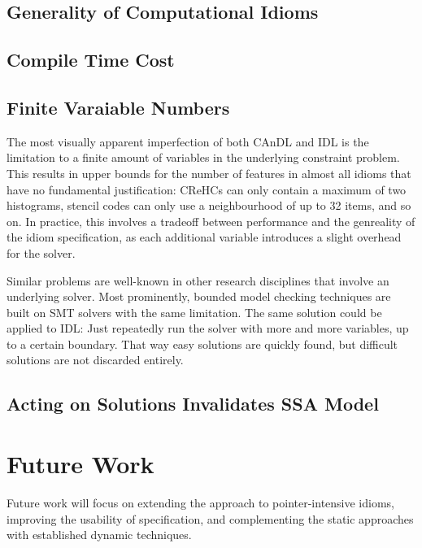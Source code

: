 \subsection{Generality of Computational Idioms}    

\subsection{Compile Time Cost}

\subsection{Finite Varaiable Numbers}

    The most visually apparent imperfection of both CAnDL and IDL is the
    limitation to a finite amount of variables in the underlying constraint
    problem.
    This results in upper bounds for the number of features in almost all idioms
    that have no fundamental justification:
    CReHCs can only contain a maximum of two histograms, stencil codes can only
    use a neighbourhood of up to 32 items, and so on.
    In practice, this involves a tradeoff between performance and the genreality
    of the idiom specification, as each additional variable introduces a slight
    overhead for the solver.

    Similar problems are well-known in other research disciplines that involve
    an underlying solver.
    Most prominently, bounded model checking techniques are built on SMT solvers
    with the same limitation.
    The same solution could be applied to IDL: Just repeatedly run the solver
    with more and more variables, up to a certain boundary.
    That way easy solutions are quickly found, but difficult solutions are not
    discarded entirely.

\subsection{Acting on Solutions Invalidates SSA Model}

\pagebreak
\section{Future Work}

    Future work will focus on extending the approach to pointer-intensive
    idioms, improving the usability of specification, and complementing
    the static approaches with established dynamic techniques.

